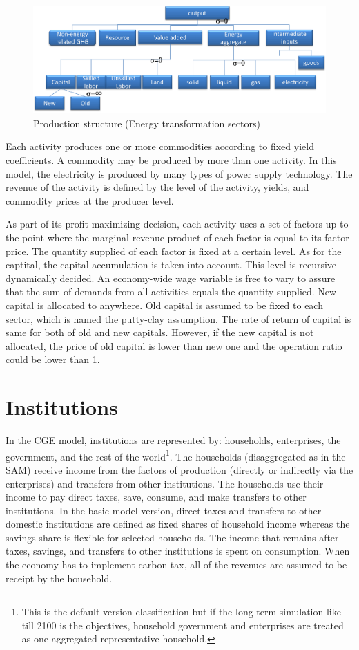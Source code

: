 \documentclass[10pt,a4paper,titlepage,dvipdfmx]{book}
\begin{document}
\begin{figure}
\includegraphics[width=1\textwidth]{fig/image5.png}
\caption{\label{fig:Production structure 3}Production structure (Energy transformation sectors)} 
\end{figure}
Each activity produces one or more commodities according to fixed yield coefficients. A commodity may be produced by more than one activity. In this model, the electricity is produced by many types of power supply technology. The revenue of the activity is defined by the level of the activity, yields, and commodity prices at the producer level. 

As part of its profit-maximizing decision, each activity uses a set of factors up to the point where the marginal revenue product of each factor is equal to its factor price. The quantity supplied of each factor is fixed at a certain level. As for the captital, the capital accumulation is taken into account. This level is recursive dynamically decided. An economy-wide wage variable is free to vary to assure that the sum of demands from all activities equals the quantity supplied. New capital is allocated to anywhere. Old capital is assumed to be fixed to each sector, which is named the putty-clay assumption. The rate of return of capital is same for both of old and new capitals. However, if the new capital is not allocated, the price of old capital is lower than new one and the operation ratio could be lower than 1. 

\section{\label{sec:Inst}Institutions}

In the CGE model, institutions are represented by: households, enterprises, the government, and the rest of the world\footnote{This is the default version classification but if the long-term simulation like till 2100 is the objectives, household government and enterprises are treated as one aggregated representative household. }. The households (disaggregated as in the SAM) receive income from the factors of production (directly or indirectly via the enterprises) and transfers from other institutions. The households use their income to pay direct taxes, save, consume, and make transfers to other institutions. In the basic model version, direct taxes and transfers to other domestic institutions are defined as fixed shares of household income whereas the savings share is flexible for selected households. The income that remains after taxes, savings, and transfers to other institutions is spent on consumption. When the economy has to implement carbon tax, all of the revenues are assumed to be receipt by the household.
\end{document}
